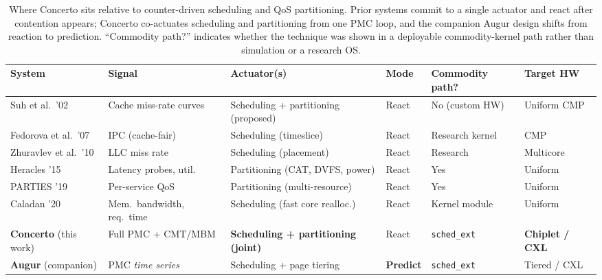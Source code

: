 \documentclass[sigconf,nonacm]{acmart}
\begin{document}
\begin{table}[t]
\centering
\footnotesize
\setlength{\tabcolsep}{6pt}
\renewcommand{\arraystretch}{1.3}
\begin{tabular}{@{}>{\raggedright}p{2.6cm} >{\raggedright}p{3.1cm} >{\raggedright}p{3.5cm} l >{\raggedright}p{2.3cm} >{\raggedright\arraybackslash}p{2.2cm}@{}}
\toprule
\textbf{System} & \textbf{Signal} & \textbf{Actuator(s)} & \textbf{Mode} & \textbf{Commodity path?} & \textbf{Target HW} \\
\midrule
Suh et al.\ '02~\cite{suh2002memory}        & Cache miss-rate curves        & Scheduling + partitioning (proposed) & React   & No (custom HW)   & Uniform CMP \\
Fedorova et al.\ '07~\cite{fedorova2007isolation} & IPC (cache-fair)        & Scheduling (timeslice)               & React   & Research kernel  & CMP \\
Zhuravlev et al.\ '10~\cite{zhuravlev2010contention} & LLC miss rate        & Scheduling (placement)               & React   & Research         & Multicore \\
Heracles '15~\cite{lo2015heracles}          & Latency probes, util.\        & Partitioning (CAT, DVFS, power)      & React   & Yes              & Uniform \\
PARTIES '19~\cite{chen2019parties}          & Per-service QoS               & Partitioning (multi-resource)        & React   & Yes              & Uniform \\
Caladan '20~\cite{fried2020caladan}         & Mem.\ bandwidth, req.\ time   & Scheduling (fast core realloc.)      & React   & Kernel module    & Uniform \\
\textbf{Concerto} (this work)               & Full PMC + CMT/MBM            & \textbf{Scheduling + partitioning (joint)} & React & \texttt{sched\_ext} & \textbf{Chiplet / CXL} \\
\textbf{Augur} (companion)                  & PMC \emph{time series}        & Scheduling + page tiering            & \textbf{Predict} & \texttt{sched\_ext} & Tiered / CXL \\
\bottomrule
\end{tabular}
\caption{Where Concerto sits relative to counter-driven scheduling and QoS
partitioning. Prior systems commit to a single actuator and react after
contention appears; Concerto co-actuates scheduling and partitioning from one PMC
loop, and the companion Augur design shifts from reaction to prediction.
``Commodity path?'' indicates whether the technique was shown in a deployable
commodity-kernel path rather than simulation or a research OS.}
\label{tab:related}
\end{table}
\end{document}
